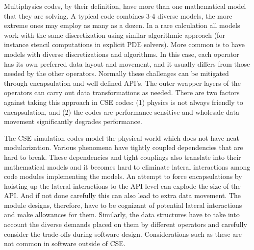 \label{sec:domainChallenges}
Multiphysics codes, by their definition, have more than one
mathematical model that they are solving. A typical code combines 3-4
diverse models, the more extreme ones may employ as many as a
dozen.
In a rare calculation all models work with the same
discretization using similar algorithmic approach (for instance
stencil computations in explicit PDE solvers). More common is to have
models with diverse discretizations and algorithms. In this case, each operator has
its own preferred data layout and movement, and it usually differs
from those needed by the other operators.  Normally these challenges
can be mitigated through encapsulation and well defined API's. The outer
wrapper layers of the operators can carry out data transformations as
needed. There are two factors against taking this approach in CSE
codes: (1) physics is not always friendly to encapsulation, and (2)
the codes are performance sensitive and wholesale data movement
significantly degrades performance. 

The CSE simulation codes model the physical world which does not
have neat modularization. Various phenomena have tightly coupled
dependencies that are hard to break. These dependencies and tight
couplings also translate into their mathematical models and it becomes
hard to eliminate lateral interactions among code modules implementing
the models. An attempt to force encapsulations by hoisting up the
lateral interactions to the API level can explode the size of the
API. And if not done carefully this can also lead to extra data
movement. The module designs, therefore, have to be cognizant of
potential lateral interactions and make allowances for them.
Similarly, the data structures have to take into account the diverse
demands placed on them by different operators and carefully consider
the trade-offs during software design. Considerations such as these
are not common in software outside of CSE.  


